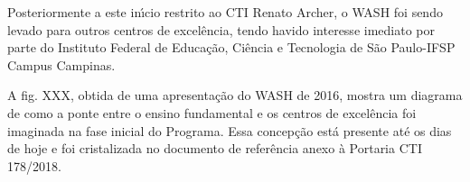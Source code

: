 \documentclass[
12pt,		%
openright,	%
twoside,  %
a4paper,			%
chapter=TITLE,		%
english,			%
french,				%
spanish,			%
brazil				%
]{USPSC-classe/USPSC}
\begin{document}
\noindent\begin{center}\mbox{\centering{}}\end{center}


Posteriormente a este in\'{\i}cio restrito ao CTI Renato Archer, o WASH foi sendo levado para outros centros de excel\^encia, tendo havido interesse imediato por parte do Instituto Federal de Educa\c{c}\~ao, Ci\^encia e Tecnologia de S\~ao Paulo-IFSP Campus Campinas.

















A fig. XXX, obtida de uma apresenta\c{c}\~ao do WASH de 2016, mostra um diagrama de como a ponte entre o ensino fundamental e os centros de excel\^encia foi imaginada na fase inicial do Programa. Essa concep\c{c}\~ao est\'a presente at\'e os dias de hoje e foi cristalizada no documento de refer\^encia anexo \`a Portaria CTI 178/2018.
\end{document}
